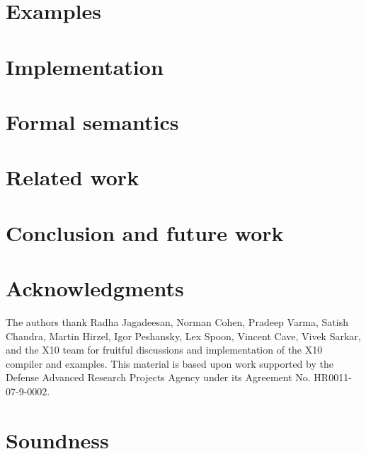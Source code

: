 \documentclass[10pt]{sigplanconf}
\begin{document}
\label{method-sec}


\section{Examples}\label{sec:examples}


\section{Implementation}\label{sec:implementation}
\label{sec:impl}


\section{Formal semantics}
\label{sec:semantics}


\section{Related work}\label{sec:related}


\section{Conclusion and future work}\label{sec:future}\label{sec:conclusions}
%

\fi

\section*{Acknowledgments}

The authors thank Radha Jagadeesan,
Norman Cohen, Pradeep Varma,
Satish Chandra, Martin Hirzel, Igor Peshansky,
Lex Spoon, Vincent Cave, Vivek Sarkar,
and the X10 team for fruitful discussions and implementation of
the X10 compiler and examples.
This material is based upon work supported by the Defense
Advanced Research Projects Agency under its Agreement No.
HR0011-07-9-0002.





\appendix

\section{Soundness}
\label{sec:proof}



% 
\end{document}
